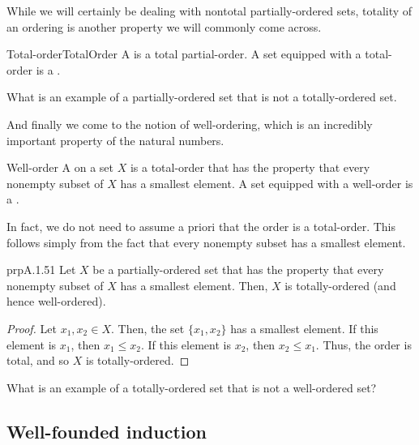 While we will certainly be dealing with nontotal partially-ordered sets, totality of an ordering is another property we will commonly come across.
\begin{dfn}{Total-order}{TotalOrder}
A  is a total partial-order.  A set equipped with a total-order is a .
\end{dfn}
\begin{exr}{}{}
What is an example of a partially-ordered set that is not a totally-ordered set.
\end{exr}

And finally we come to the notion of well-ordering, which is an incredibly important property of the natural numbers.
\begin{dfn}{Well-order}{}
A  on a set $X$ is a total-order that has the property that every nonempty subset of $X$ has a smallest element.  A set equipped with a well-order is a . 
\end{dfn}
In fact, we do not need to assume a priori that the order is a total-order.  This follows simply from the fact that every nonempty subset has a smallest element.
\begin{prp}{}{prpA.1.51}
Let $X$ be a partially-ordered set that has the property that every nonempty subset of $X$ has a smallest element.  Then, $X$ is totally-ordered (and hence well-ordered).
\begin{proof}
Let $x_1,x_2\in X$.  Then, the set $\{ x_1,x_2\}$ has a smallest element.  If this element is $x_1$, then $x_1\leq x_2$.  If this element is $x_2$, then $x_2\leq x_1$.  Thus, the order is total, and so $X$ is totally-ordered.
\end{proof}
\end{prp}
\begin{exr}{}{}
What is an example of a totally-ordered set that is not a well-ordered set?
\end{exr}

\subsection{Well-founded induction}\label{sbsWellFoundedInduction}

